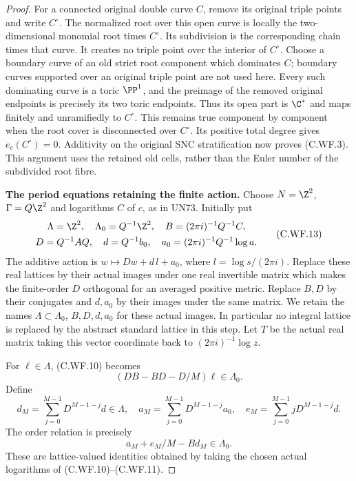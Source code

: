 \begin{proof}
For a connected original double curve \(C\), remove its
original triple points and write \(C^\circ\).  The normalized
root over this open curve is locally the two-dimensional
monomial root times \(C^\circ\).  Its subdivision is the
corresponding chain times that curve.  It creates no triple
point over the interior of \(C^\circ\).  Choose a boundary
curve of an old strict root component which dominates \(C\);
boundary curves supported over an original triple point
are not used here.  Every such dominating curve is a toric
\(\PP^1\), and the
preimage of the removed original endpoints is precisely
its two toric endpoints.  Thus its open part is \(\C^*\)
and maps finitely and unramifiedly to \(C^\circ\).
This remains true component by component when the root
cover is disconnected over \(C^\circ\).  Its positive total
degree gives \(e_c(C^\circ)=0\).  Additivity on the original
SNC stratification now proves (C.WF.3).  This argument
uses the retained old cells, rather than the Euler number
of the subdivided root fibre.

\par\medskip\noindent\textbf{The period equations retaining the finite action.}
Choose \(N=\Z^2\), \(\Gamma=Q\Z^2\) and logarithms \(C\)
of \(c\), as in UN73.  Initially put
\[
 \begin{gathered}
 \Lambda= \Z^2,\quad \Lambda_0=Q^{-1}\Z^2,\quad
 B=(2\pi i)^{-1}Q^{-1}C,\\
 D=Q^{-1}AQ,\quad
 d=Q^{-1}b_0,\quad
 a_0=(2\pi i)^{-1}Q^{-1}\log a .
 \end{gathered}
\tag{C.WF.13}
\]
The additive action is \(w\mapsto Dw+d\,l+a_0\),
where \(l=\log s/(2\pi i)\).  Replace these real lattices
by their actual images under one real invertible matrix
which makes the finite-order \(D\) orthogonal for an
averaged positive metric.  Replace \(B,D\) by their
conjugates and \(d,a_0\) by their images under the same
matrix.  We retain the names
\(\Lambda\subset\Lambda_0\), \(B,D,d,a_0\) for these
actual images.  In particular no integral lattice is
replaced by the abstract standard lattice in this step.
Let \(T\) be the actual real matrix taking this vector
coordinate back to \((2\pi i)^{-1}\log z\).

For \(\ell\in\Lambda\), (C.WF.10) becomes
\[
       (DB-BD-D/M)\ell\in\Lambda_0.
\tag{C.WF.14}
\]
Define
\[
 d_M=\sum_{j=0}^{M-1}D^{M-1-j}d\in\Lambda,\quad
 a_M=\sum_{j=0}^{M-1}D^{M-1-j}a_0,\quad
 e_M=\sum_{j=0}^{M-1}jD^{M-1-j}d .
\]
The order relation is precisely
\[
                   a_M+e_M/M-Bd_M\in\Lambda_0 .
\tag{C.WF.15}
\]
These are lattice-valued identities obtained by taking
the chosen actual logarithms of (C.WF.10)--(C.WF.11).


\end{proof}
